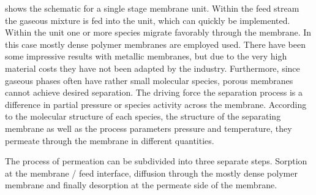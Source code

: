 %	


 shows the schematic for a single stage membrane unit. Within the feed stream 
the gaseous mixture is fed into the unit, which can quickly be implemented. Within the unit one or more 
species migrate favorably through the membrane. In this case mostly dense polymer membranes are 
employed used. There have been some impressive results with metallic membranes, but due to 
the very high material costs they have not been adapted by the industry. Furthermore, since gaseous 
phases often have rather small molecular species, porous membranes cannot achieve desired separation. 
The driving force the separation process is a difference in partial pressure or species activity across the 
membrane. According to the molecular structure of each species, the structure of the separating membrane 
as well as the process parameters pressure and temperature, they permeate through the membrane in 
different quantities.

The process of permeation can be subdivided into three separate steps. Sorption at the membrane / 
feed interface, diffusion through the mostly dense polymer membrane and finally desorption at the 
permeate side of the membrane. 
